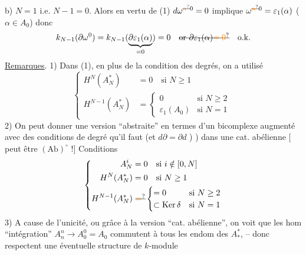 b) $N=1$ i.e. $N-1=0$. Alors en vertu de (1)  $d\omega^{\deleted{\unsure{n}}0}=0$ implique $\omega^{\deleted{\unsure{n}}0}=\varepsilon_1(\alpha)$ ($\alpha\in A_0$) donc
\[
 k_{N-1}(\partial\omega^0)=k_{N-1}(\underbrace{\partial\varepsilon_1(\alpha)}_{=0})=0
 \quad\deleted{\text{or }\partial\varepsilon_1(\alpha)\unsure{=0}}\quad\text{o.k.}
\]
\uline{Remarques}. 1) Dans  (1), en plus de la condition des degrés, on a utilisé
\[
 \left\{\begin{aligned}
 H^N(A_N^*)&=0\quad\text{si }N\geq1\\
 H^{N-1}(A_N^*)&=\begin{cases}0&\text{si }N\geq2\\\varepsilon_1(A_0)&\text{si }N=1\end{cases}
 \end{aligned}\right.
\]
2) On peut donner une version ``abstraite'' en termes d'un bicomplexe augmenté avec des conditions de degré qu'il faut (et $d\partial=\partial d$ \unsure{!}) ) dans une cat. abélienne [ peut être $(\mathrm{Ab})^\circ$ !] Conditions
\[
 \left\{\begin{aligned}
 A_N^i&=0\quad\text{si }i\notin[0,N]\\
 H^N(A_N^*)&=0\quad\text{si }N\geq1\\
 H^{N-1}(A_N^*)&\ \deleted{\unsure{=}}\begin{cases}=0&\text{si }N\geq2\\
 \subset\operatorname{Ker}\delta&\text{si }N=1\end{cases}
 \end{aligned}\right.
\]
3) A cause de l'unicité, ou grâce à la version ``cat. abélienne'', on voit que les hom ``intégration'' $A_n^n\to A_0^0=A_0$ commutent à tous les endom des $A_*^*$, -- donc respectent une éventuelle structure de $k$-module

